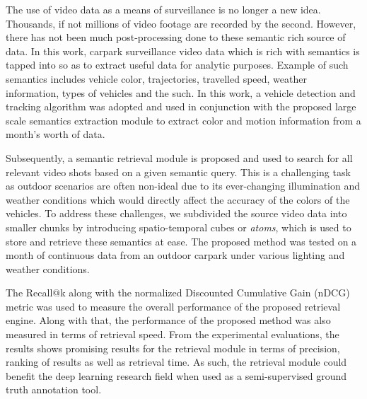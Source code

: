 
The use of video data as a means of surveillance is no longer a new idea. Thousands, if not millions of video footage are recorded by the second. However, there has not been much post-processing done to these semantic rich source of data. In this work, carpark surveillance video data which is rich with semantics is tapped into so as to extract useful data for analytic purposes. Example of such semantics includes vehicle color, trajectories, travelled speed, weather information, types of vehicles and the such. In this work, a vehicle detection and tracking algorithm was adopted and used in conjunction with the proposed large scale semantics extraction module to extract color and motion information from a month's worth of data. 

Subsequently, a semantic retrieval module is proposed and used to search for all relevant video shots based on a given semantic query. This is a challenging task as outdoor scenarios are often non-ideal due to its ever-changing illumination and weather conditions which would directly affect the accuracy of the colors of the vehicles. To address these challenges, we subdivided the source video data into smaller chunks by introducing spatio-temporal cubes or \emph{atoms}, which is used to store and retrieve these semantics at ease. The proposed method was tested on a month of continuous data from an outdoor carpark under various lighting and weather conditions. 

The Recall@k along with the normalized Discounted Cumulative Gain (nDCG) metric was used to measure the overall performance of the proposed retrieval engine. Along with that, the performance of the proposed method was also measured in terms of retrieval speed. From the experimental evaluations, the results shows promising results for the retrieval module in terms of precision, ranking of results as well as retrieval time. As such, the retrieval module could benefit the deep learning research field when used as a semi-supervised ground truth annotation tool.


